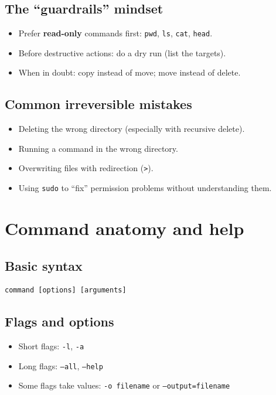 \subsection{The ``guardrails'' mindset}
\begin{itemize}
\item Prefer \textbf{read-only} commands first: \texttt{pwd}, \texttt{ls}, \texttt{cat}, \texttt{head}.
\item Before destructive actions: do a dry run (list the targets).
\item When in doubt: copy instead of move; move instead of delete.
\end{itemize}

\subsection{Common irreversible mistakes}
\begin{itemize}
\item Deleting the wrong directory (especially with recursive delete).
\item Running a command in the wrong directory.
\item Overwriting files with redirection (\texttt{>}).
\item Using \texttt{sudo} to ``fix'' permission problems without understanding them.
\end{itemize}

\section{Command anatomy and help}
\subsection{Basic syntax}
\begin{verbatim}
command [options] [arguments]
\end{verbatim}

\subsection{Flags and options}
\begin{itemize}
\item Short flags: \texttt{-l}, \texttt{-a}
\item Long flags: \texttt{--all}, \texttt{--help}
\item Some flags take values: \texttt{-o filename} or \texttt{--output=filename}
\end{itemize}

